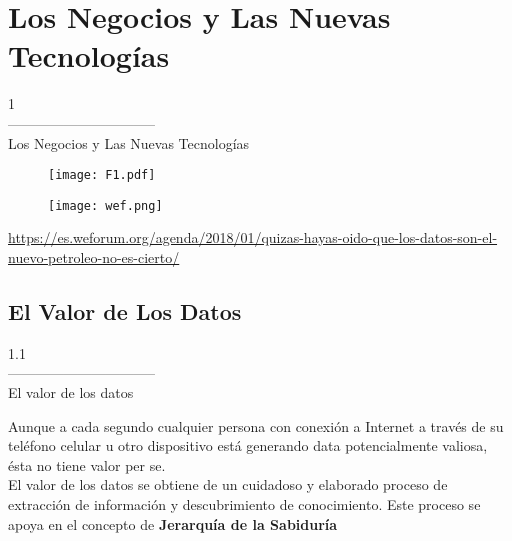 \documentclass[aspectratio=169]{beamer}
\begin{document}
\section{Los Negocios y Las Nuevas Tecnologías}
\begin{frame}
\begin{center}
\Huge
\textcolor{azulcesaclaro}{1\\
--------------------------------\\
Los Negocios y Las Nuevas Tecnologías}
\end{center}
\end{frame}


\begin{frame}
\begin{figure}
\centering
 \texttt{[image: F1.pdf]}
\end{figure}
\end{frame}

\begin{frame}
\begin{figure}
\centering
 \texttt{[image: wef.png]}
\end{figure}
\tiny{
\textcolor{blue}{\url{https://es.weforum.org/agenda/2018/01/quizas-hayas-oido-que-los-datos-son-el-nuevo-petroleo-no-es-cierto/}}}
\end{frame}

\subsection{El Valor de Los Datos}

\begin{frame}
\begin{center}
\Huge
\textcolor{azulcesaclaro}{1.1\\
--------------------------------\\
El valor de los datos}
\end{center}
\end{frame}

\begin{frame}
Aunque a cada segundo cualquier persona con conexión a Internet a través de su teléfono celular u otro dispositivo está generando data potencialmente valiosa, ésta no tiene valor per se.\\
\vspace{0.5cm}
El valor de los datos se obtiene de un cuidadoso y elaborado proceso de extracción de información y descubrimiento de conocimiento. Este proceso se apoya en el concepto de \textbf{Jerarquía de la Sabiduría} \cite{Rowley2007}
\end{frame}
\end{document}
